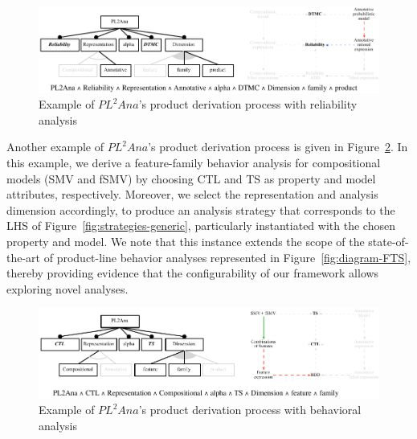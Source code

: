 \begin{figure}[htbp]
	\centering
	\includegraphics[width=0.9\linewidth]{figures/workflow-reliability.pdf}
	\caption{Example of $PL^{2}Ana$'s product derivation process with reliability analysis}
	\label{fig:workflow-reliability}
\end{figure}

Another example of $PL^{2}Ana$'s product derivation process is given in Figure~\ref{fig:workflow-behavior}. In this example, we derive a feature-family behavior analysis for compositional models (SMV and fSMV)
by choosing CTL and TS as property and model attributes, respectively. 
Moreover, we select the representation and analysis dimension accordingly, 
to produce an analysis strategy that corresponds to the LHS of Figure~\ref{fig:strategies-generic}, 
particularly instantiated with the chosen property and model. We note that this instance extends the scope of the state-of-the-art of product-line behavior analyses represented in Figure~\ref{fig:diagram-FTS}, thereby providing evidence that the configurability of our framework allows exploring novel analyses.

\begin{figure}[htbp]
	\centering
	\includegraphics[width=0.9\linewidth]{figures/workflow-behavior.pdf}
	\caption{Example of $PL^{2}Ana$'s product derivation process with behavioral analysis}
	\label{fig:workflow-behavior}
\end{figure}



